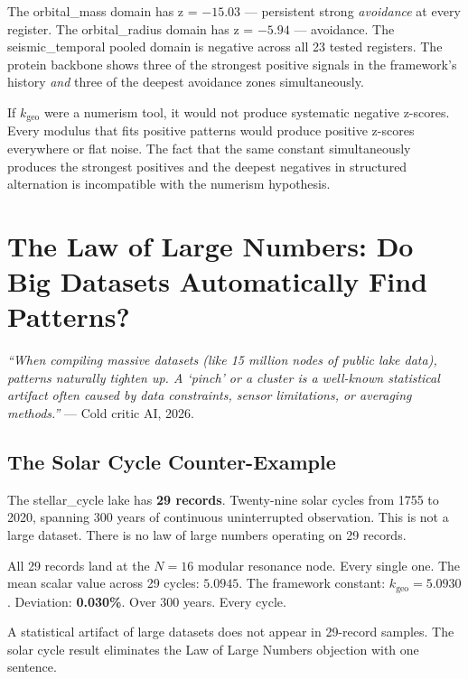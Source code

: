\documentclass[11pt, letterpaper, openany]{book}
\begin{document}
The orbital\_mass domain has z = $-15.03$ --- persistent strong
\textit{avoidance} at every register. The orbital\_radius domain has
z = $-5.94$ --- avoidance. The seismic\_temporal pooled domain is
negative across all 23 tested registers. The protein backbone shows
three of the strongest positive signals in the framework's history
\textit{and} three of the deepest avoidance zones simultaneously.

If $k_\text{geo}$ were a numerism tool, it would not produce systematic
negative z-scores. Every modulus that fits positive patterns would
produce positive z-scores everywhere or flat noise. The fact that the
same constant simultaneously produces the strongest positives and the
deepest negatives in structured alternation is incompatible with the
numerism hypothesis.

\clearpage
\chapter{The Law of Large Numbers: Do Big Datasets Automatically Find Patterns?}

\begin{objectionbox}
\textit{``When compiling massive datasets (like 15 million nodes
of public lake data), patterns naturally tighten up. A `pinch' or
a cluster is a well-known statistical artifact often caused by
data constraints, sensor limitations, or averaging methods.''} ---
Cold critic AI, 2026.
\end{objectionbox}

\section{The Solar Cycle Counter-Example}

The stellar\_cycle lake has \textbf{29 records}. Twenty-nine solar
cycles from 1755 to 2020, spanning 300 years of continuous
uninterrupted observation. This is not a large dataset. There
is no law of large numbers operating on 29 records.

All 29 records land at the $N = 16$ modular resonance node.
Every single one. The mean scalar value across 29 cycles:
$5.0945$. The framework constant: $k_\text{geo} = 5.0930$.
Deviation: \textbf{0.030\%}. Over 300 years. Every cycle.

A statistical artifact of large datasets does not appear in
29-record samples. The solar cycle result eliminates the
Law of Large Numbers objection with one sentence.
\end{document}
